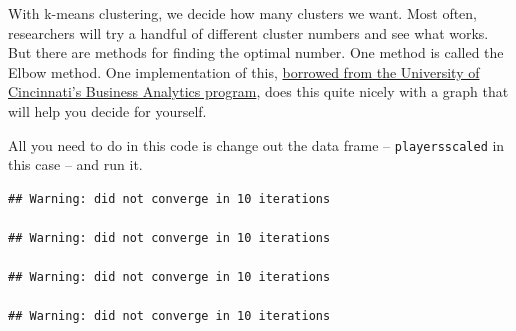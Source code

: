 \documentclass[]{book}
\newenvironment{Shaded}{\begin{snugshade}}{\end{snugshade}}
\newcommand{\CommentTok}[1]{\textcolor[rgb]{0.56,0.35,0.01}{\textit{#1}}}
\newcommand{\ControlFlowTok}[1]{\textcolor[rgb]{0.13,0.29,0.53}{\textbf{#1}}}
\newcommand{\DataTypeTok}[1]{\textcolor[rgb]{0.13,0.29,0.53}{#1}}
\newcommand{\DecValTok}[1]{\textcolor[rgb]{0.00,0.00,0.81}{#1}}
\newcommand{\KeywordTok}[1]{\textcolor[rgb]{0.13,0.29,0.53}{\textbf{#1}}}
\newcommand{\NormalTok}[1]{#1}
\newcommand{\OperatorTok}[1]{\textcolor[rgb]{0.81,0.36,0.00}{\textbf{#1}}}
\newcommand{\StringTok}[1]{\textcolor[rgb]{0.31,0.60,0.02}{#1}}
\begin{document}
\begin{Shaded}
\end{Shaded}

With k-means clustering, we decide how many clusters we want. Most often, researchers will try a handful of different cluster numbers and see what works. But there are methods for finding the optimal number. One method is called the Elbow method. One implementation of this, \href{https://uc-r.github.io/kmeans_clustering}{borrowed from the University of Cincinnati's Business Analytics program}, does this quite nicely with a graph that will help you decide for yourself.

All you need to do in this code is change out the data frame -- \texttt{playersscaled} in this case -- and run it.

\begin{Shaded}
\end{Shaded}

\begin{verbatim}
## Warning: did not converge in 10 iterations

## Warning: did not converge in 10 iterations

## Warning: did not converge in 10 iterations

## Warning: did not converge in 10 iterations
\end{verbatim}
\end{document}
